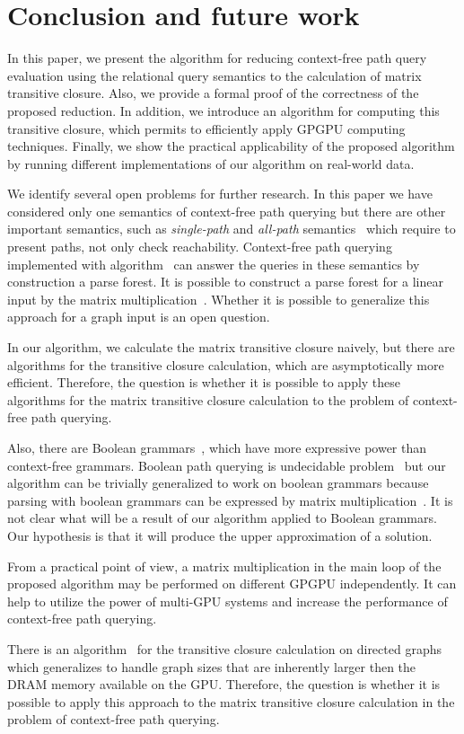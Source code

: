 \section{Conclusion and future work}
In this paper, we present the algorithm for reducing context-free path query evaluation using the relational query semantics to the calculation of matrix transitive closure. Also, we provide a formal proof of the correctness of the proposed reduction. In addition, we introduce an algorithm for computing this transitive closure, which permits to efficiently apply GPGPU computing techniques. Finally, we show the practical applicability of the proposed algorithm by running different implementations of our algorithm on real-world data.

We identify several open problems for further research. In this paper we have considered only one semantics of context-free path querying but there are other important semantics, such as \textit{single-path} and \textit{all-path} semantics~\cite{hellingsPathQuerying} which require to present paths, not only check reachability. Context-free path querying implemented with algorithm~\cite{GLL} can answer the queries in these semantics by construction a parse forest. It is possible to construct a parse forest for a linear input by the matrix multiplication~\cite{okhotin_cyk}. Whether it is possible to generalize this approach for a graph input is an open question.

In our algorithm, we calculate the matrix transitive closure naively, but there are algorithms for the transitive closure calculation, which are asymptotically more efficient. Therefore, the question is whether it is possible to apply these algorithms for the matrix transitive closure calculation to the problem of context-free path querying.

Also, there are Boolean grammars~\cite{okhotinBoolean}, which have more expressive power than context-free grammars. Boolean path querying is undecidable problem~\cite{hellingsRelational} but our algorithm can be trivially generalized to work on boolean grammars because parsing with boolean grammars can be expressed by matrix multiplication~\cite{okhotin_cyk}. It is not clear what will be a result of our algorithm applied to Boolean grammars. Our hypothesis is that it will produce the upper approximation of a solution.

From a practical point of view, a matrix multiplication in the main loop of the proposed algorithm may be performed on different GPGPU independently. It can help to utilize the power of multi-GPU systems and increase the performance of context-free path querying.

There is an algorithm~\cite{apspGPU} for the transitive closure calculation on directed graphs which generalizes to handle graph sizes that are inherently larger then the DRAM memory available on the GPU. Therefore, the question is whether it is possible to apply this approach to the matrix transitive closure calculation in the problem of context-free path querying.